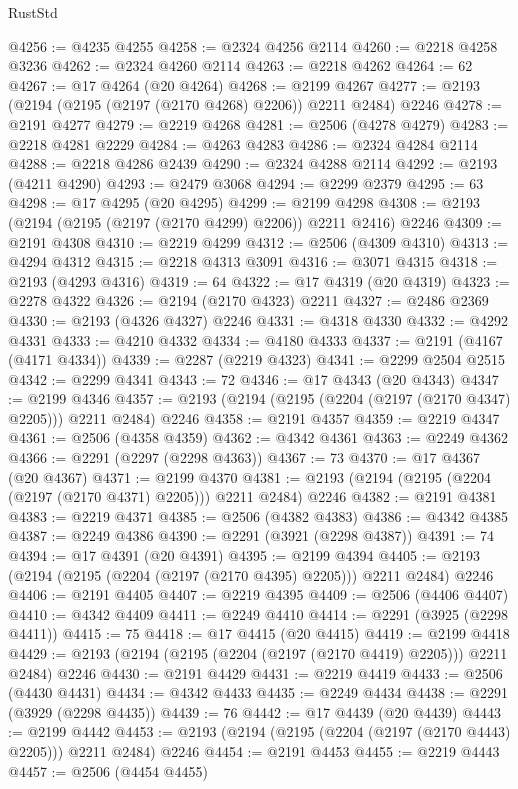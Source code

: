 \begin{lexlean}{RustStd}
\begin{coremodule}
@4256 := @4235 @4255
@4258 := @2324 @4256 @2114
@4260 := @2218 @4258 @3236
@4262 := @2324 @4260 @2114
@4263 := @2218 @4262
@4264 := 62
@4267 := @17 @4264 (@20 @4264)
@4268 := @2199 @4267
@4277 := @2193 (@2194 (@2195 (@2197 (@2170 @4268) @2206)) @2211 @2484) @2246
@4278 := @2191 @4277
@4279 := @2219 @4268
@4281 := @2506 (@4278 @4279)
@4283 := @2218 @4281 @2229
@4284 := @4263 @4283
@4286 := @2324 @4284 @2114
@4288 := @2218 @4286 @2439
@4290 := @2324 @4288 @2114
@4292 := @2193 (@4211 @4290)
@4293 := @2479 @3068
@4294 := @2299 @2379
@4295 := 63
@4298 := @17 @4295 (@20 @4295)
@4299 := @2199 @4298
@4308 := @2193 (@2194 (@2195 (@2197 (@2170 @4299) @2206)) @2211 @2416) @2246
@4309 := @2191 @4308
@4310 := @2219 @4299
@4312 := @2506 (@4309 @4310)
@4313 := @4294 @4312
@4315 := @2218 @4313 @3091
@4316 := @3071 @4315
@4318 := @2193 (@4293 @4316)
@4319 := 64
@4322 := @17 @4319 (@20 @4319)
@4323 := @2278 @4322
@4326 := @2194 (@2170 @4323) @2211
@4327 := @2486 @2369
@4330 := @2193 (@4326 @4327) @2246
@4331 := @4318 @4330
@4332 := @4292 @4331
@4333 := @4210 @4332
@4334 := @4180 @4333
@4337 := @2191 (@4167 (@4171 @4334))
@4339 := @2287 (@2219 @4323)
@4341 := @2299 @2504 @2515
@4342 := @2299 @4341
@4343 := 72
@4346 := @17 @4343 (@20 @4343)
@4347 := @2199 @4346
@4357 := @2193 (@2194 (@2195 (@2204 (@2197 (@2170 @4347) @2205))) @2211 @2484) @2246
@4358 := @2191 @4357
@4359 := @2219 @4347
@4361 := @2506 (@4358 @4359)
@4362 := @4342 @4361
@4363 := @2249 @4362
@4366 := @2291 (@2297 (@2298 @4363))
@4367 := 73
@4370 := @17 @4367 (@20 @4367)
@4371 := @2199 @4370
@4381 := @2193 (@2194 (@2195 (@2204 (@2197 (@2170 @4371) @2205))) @2211 @2484) @2246
@4382 := @2191 @4381
@4383 := @2219 @4371
@4385 := @2506 (@4382 @4383)
@4386 := @4342 @4385
@4387 := @2249 @4386
@4390 := @2291 (@3921 (@2298 @4387))
@4391 := 74
@4394 := @17 @4391 (@20 @4391)
@4395 := @2199 @4394
@4405 := @2193 (@2194 (@2195 (@2204 (@2197 (@2170 @4395) @2205))) @2211 @2484) @2246
@4406 := @2191 @4405
@4407 := @2219 @4395
@4409 := @2506 (@4406 @4407)
@4410 := @4342 @4409
@4411 := @2249 @4410
@4414 := @2291 (@3925 (@2298 @4411))
@4415 := 75
@4418 := @17 @4415 (@20 @4415)
@4419 := @2199 @4418
@4429 := @2193 (@2194 (@2195 (@2204 (@2197 (@2170 @4419) @2205))) @2211 @2484) @2246
@4430 := @2191 @4429
@4431 := @2219 @4419
@4433 := @2506 (@4430 @4431)
@4434 := @4342 @4433
@4435 := @2249 @4434
@4438 := @2291 (@3929 (@2298 @4435))
@4439 := 76
@4442 := @17 @4439 (@20 @4439)
@4443 := @2199 @4442
@4453 := @2193 (@2194 (@2195 (@2204 (@2197 (@2170 @4443) @2205))) @2211 @2484) @2246
@4454 := @2191 @4453
@4455 := @2219 @4443
@4457 := @2506 (@4454 @4455)

\end{coremodule}
\end{lexlean}

